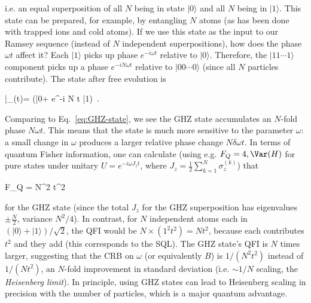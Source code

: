 i.e. an equal superposition of all $N$ being in state $|0\rangle$ and all $N$ being in $|1\rangle$. This state can be prepared, for example, by entangling $N$ atoms (as has been done with trapped ions and cold atoms). If we use this state as the input to our Ramsey sequence (instead of $N$ independent superpositions), how does the phase $\omega t$ affect it? Each $|1\rangle$ picks up phase $e^{-i\omega t}$ relative to $|0\rangle$. Therefore, the $|11\cdots1\rangle$ component picks up a phase $e^{-i N \omega t}$ relative to $|00\cdots0\rangle$ (since all $N$ particles contribute). The state after free evolution is

|\Psi_{}(t)\rangle = \Big(|0\rangle + e^{-i N \omega t} |1\rangle\Big) \,.

Comparing to Eq.~\eqref{eq:GHZ-state}, we see the GHZ state accumulates an $N$-fold phase $N\omega t$. This means that the state is much more sensitive to the parameter $\omega$: a small change in $\omega$ produces a larger relative phase change $N\delta\omega t$. In terms of quantum Fisher information, one can calculate (using e.g. $F_Q = 4,\Var(H)$ for pure states under unitary $U=e^{-i\omega J_z t}$, where $J_z = \frac{1}{2}\sum_{k=1}^N \sigma^{(k)}_z$) that

F_Q = N^2 t^2

for the GHZ state (since the total $J_z$ for the GHZ superposition has eigenvalues $\pm \frac{N}{2}$, variance $N^2/4$). In contrast, for $N$ independent atoms each in $(|0\rangle+|1\rangle)/\sqrt{2}$, the QFI would be $N \times (1^2 t^2) = N t^2$, because each contributes $t^2$ and they add (this corresponds to the SQL). The GHZ state’s QFI is $N$ times larger, suggesting that the CRB on $\omega$ (or equivalently $B$) is $1/(N^2 t^2)$ instead of $1/(N t^2)$, an $N$-fold improvement in standard deviation (i.e. $\sim 1/N$ scaling, the \textit{Heisenberg limit}). In principle, using GHZ states can lead to Heisenberg scaling in precision with the number of particles, which is a major quantum advantage.



